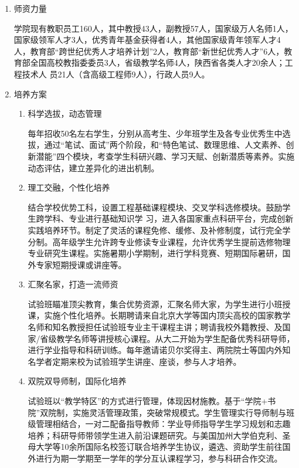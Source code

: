 \documentclass[zihao=-4,fontset=none]{Beautybook-CN}
\begin{document}
\begin{enumerate}
	\item 师资力量
	      	      	          
	      学院现有教职员工160人，其中教授43人，副教授57人，国家级万人名师1人，国家级领军人才3人，优秀青年基金获得者4人，其他国家级青年领军人才4人，教育部“跨世纪优秀人才培养计划”2人，教育部“新世纪优秀人才”6人，教育部全国高校教指委委员3人，省级教学名师4人，陕西省各类人才20余人；工程技术人 员21人（含高级工程师9人），行政人员9人。
	       	          
	\item 培养方案
	      \begin{enumerate}
	      	\item 科学选拔，动态管理
	      	                
	      	      每年招收50名左右学生，分别从高考生、少年班学生及各专业优秀生中选拔，通过“笔试、面试”两个阶段，和“特色笔试、数理思维、人文素养、创新潜能”四个模块，考查学生科研兴趣、学习天赋、创新潜质等素养。实施动态评估，建立差异化的进出机制。
	      	      
	      	\item 理工交融，个性化培养
	      	      
	      	      结合学校优势工科，设置工程基础课程模块、交叉学科选修模块。鼓励学生跨学科、专业进行基础知识学 习，进入各国家重点科研平台，完成创新实践培养环节。制定了灵活的课程免修、缓修、及补修制度，试行完全学分制。高年级学生允许跨专业修读专业课程，允许优秀学生提前选修物理专业研究生课程。实施暑期小学期制，进行学科竞赛、短期国际暑研，国外专家短期授课或讲座等。
	      	      
	      	\item 汇聚名家，打造一流师资
	      	      
	      	      试验班瞄准顶尖教育，集合优势资源，汇聚名师大家，为学生进行小班授课，实施个性化培养。长期聘请来自北京大学等国内顶尖高校的国家教学名师和知名教授担任试验班专业主干课程主讲；聘请我校外籍教授、及国家/省级教学名师等讲授核心课程。从大二开始为学生配备优秀科研导师，进行学业指导和科研训练。每年邀请诺贝尔奖得主、两院院士等国内外知名学者定期来校为试验班学生讲座、座谈，参与人才培养。
	      	      
	      	\item 双院双导师制，国际化培养
	      	      
	      	      试验班以“教学特区”的方式进行管理，体现因材施教。基于“学院+书院”双院制，实施灵活管理政策，突破常规模式。学生管理实行导师制与班级管理相结合，一对二配备指导教师：学业导师指导学生学习规划和志趣培养；科研导师带领学生进入前沿课题研究。与美国加州大学伯克利、圣母大学等10余所国际名校签订联合培养学生协议，遴选、资助学生前往国外进行为期一学期至一学年的学分互认课程学习，参与科研合作交流。
	      	      

\end{enumerate}
\end{enumerate}
\end{document}
